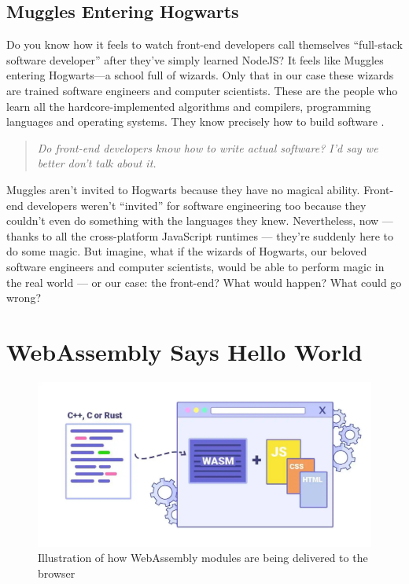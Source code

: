 \documentclass[10pt]{article}  %
\begin{document}
\begin{sloppypar}
  \subsection{Muggles Entering Hogwarts}
  \label{sec:muggles}

  Do you know how it feels to watch front-end developers call themselves “full-stack software developer” after they’ve simply learned NodeJS? It feels like Muggles entering Hogwarts—a school full of wizards. Only that in our case these wizards are trained software engineers and computer scientists. These are the people who learn all the hardcore-implemented algorithms and compilers, programming languages and operating systems. They know precisely how to build software \citep{might_what_2011}.

  \begin{quote}
    \emph{Do front-end developers know how to write actual software? I’d say we better don’t talk about it.}
  \end{quote}

  Muggles aren’t invited to Hogwarts because they have no magical ability. Front-end developers weren’t “invited” for software engineering too because they couldn’t even do something with the languages they knew. Nevertheless, now — thanks to all the cross-platform JavaScript runtimes — they’re suddenly here to do some magic. But imagine, what if the wizards of Hogwarts, our beloved software engineers and computer scientists, would be able to perform magic in the real world — or our case: the front-end? What would happen? What could go wrong?

  \section{WebAssembly Says Hello World}
  \label{sec:hello-world}

  \begin{figure}[ht]
    \centering
    \includegraphics[width=\textwidth]{figures/004.jpg}
    \caption{Illustration of how WebAssembly modules are being delivered to the browser \citep{logrocket_logrocket_nodate}}
    \label{fig:wasm}
  \end{figure}


\end{sloppypar}
\end{document}
